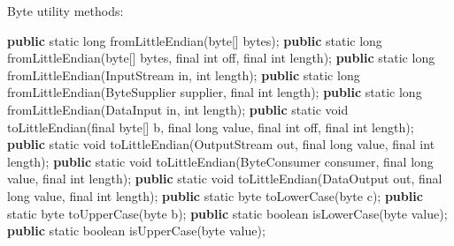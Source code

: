 \documentclass[
]{book}
\newenvironment{Shaded}{\begin{snugshade}}{\end{snugshade}}
\newcommand{\BuiltInTok}[1]{#1}
\newcommand{\DataTypeTok}[1]{\textcolor[rgb]{0.13,0.29,0.53}{#1}}
\newcommand{\FunctionTok}[1]{\textcolor[rgb]{0.00,0.00,0.00}{#1}}
\newcommand{\KeywordTok}[1]{\textcolor[rgb]{0.13,0.29,0.53}{\textbf{#1}}}
\newcommand{\NormalTok}[1]{#1}
\begin{document}
Byte utility methods:

\begin{Shaded}
\begin{Highlighting}[]
\KeywordTok{public} \DataTypeTok{static} \DataTypeTok{long} \FunctionTok{fromLittleEndian}\NormalTok{(}\DataTypeTok{byte}\NormalTok{[] bytes);}
\KeywordTok{public} \DataTypeTok{static} \DataTypeTok{long} \FunctionTok{fromLittleEndian}\NormalTok{(}\DataTypeTok{byte}\NormalTok{[] bytes, }\DataTypeTok{final} \DataTypeTok{int}\NormalTok{ off, }\DataTypeTok{final} \DataTypeTok{int}\NormalTok{ length);}
\KeywordTok{public} \DataTypeTok{static} \DataTypeTok{long} \FunctionTok{fromLittleEndian}\NormalTok{(}\BuiltInTok{InputStream}\NormalTok{ in, }\DataTypeTok{int}\NormalTok{ length);}
\KeywordTok{public} \DataTypeTok{static} \DataTypeTok{long} \FunctionTok{fromLittleEndian}\NormalTok{(ByteSupplier supplier, }\DataTypeTok{final} \DataTypeTok{int}\NormalTok{ length);}
\KeywordTok{public} \DataTypeTok{static} \DataTypeTok{long} \FunctionTok{fromLittleEndian}\NormalTok{(}\BuiltInTok{DataInput}\NormalTok{ in, }\DataTypeTok{int}\NormalTok{ length);}
\KeywordTok{public} \DataTypeTok{static} \DataTypeTok{void} \FunctionTok{toLittleEndian}\NormalTok{(}\DataTypeTok{final} \DataTypeTok{byte}\NormalTok{[] b, }\DataTypeTok{final} \DataTypeTok{long}\NormalTok{ value, }\DataTypeTok{final} \DataTypeTok{int}\NormalTok{ off, }\DataTypeTok{final} \DataTypeTok{int}\NormalTok{ length);}
\KeywordTok{public} \DataTypeTok{static} \DataTypeTok{void} \FunctionTok{toLittleEndian}\NormalTok{(}\BuiltInTok{OutputStream}\NormalTok{ out, }\DataTypeTok{final} \DataTypeTok{long}\NormalTok{ value, }\DataTypeTok{final} \DataTypeTok{int}\NormalTok{ length);}
\KeywordTok{public} \DataTypeTok{static} \DataTypeTok{void} \FunctionTok{toLittleEndian}\NormalTok{(ByteConsumer consumer, }\DataTypeTok{final} \DataTypeTok{long}\NormalTok{ value, }\DataTypeTok{final} \DataTypeTok{int}\NormalTok{ length);}
\KeywordTok{public} \DataTypeTok{static} \DataTypeTok{void} \FunctionTok{toLittleEndian}\NormalTok{(}\BuiltInTok{DataOutput}\NormalTok{ out, }\DataTypeTok{final} \DataTypeTok{long}\NormalTok{ value, }\DataTypeTok{final} \DataTypeTok{int}\NormalTok{ length);}
\KeywordTok{public} \DataTypeTok{static} \DataTypeTok{byte} \FunctionTok{toLowerCase}\NormalTok{(}\DataTypeTok{byte}\NormalTok{ c);}
\KeywordTok{public} \DataTypeTok{static} \DataTypeTok{byte} \FunctionTok{toUpperCase}\NormalTok{(}\DataTypeTok{byte}\NormalTok{ b);}
\KeywordTok{public} \DataTypeTok{static} \DataTypeTok{boolean} \FunctionTok{isLowerCase}\NormalTok{(}\DataTypeTok{byte}\NormalTok{ value);}
\KeywordTok{public} \DataTypeTok{static} \DataTypeTok{boolean} \FunctionTok{isUpperCase}\NormalTok{(}\DataTypeTok{byte}\NormalTok{ value);}
\end{Highlighting}
\end{Shaded}
\end{document}
